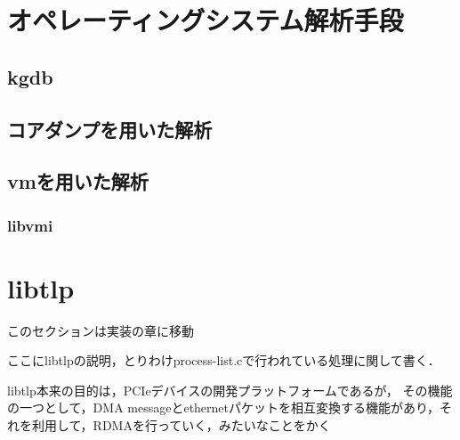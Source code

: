 \section{オペレーティングシステム解析手段}

\subsection{kgdb}

\subsection{コアダンプを用いた解析}

\subsection{vmを用いた解析}

\subsubsection{libvmi}

\section{libtlp}

このセクションは実装の章に移動

ここにlibtlpの説明，とりわけprocess-list.cで行われている処理に関して書く．

libtlp本来の目的は，PCIeデバイスの開発プラットフォームであるが，
その機能の一つとして，DMA messageとethernetパケットを相互変換する機能があり，それを利用して，RDMAを行っていく，みたいなことをかく
